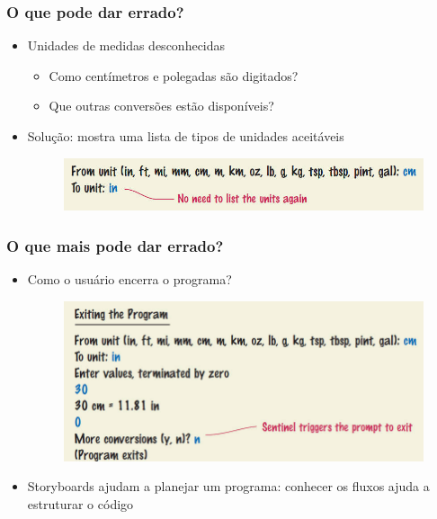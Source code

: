 \documentclass[xcolor={dvipsnames,table},aspectratio=169]{beamer}
\begin{document}
\begin{frame}\frametitle{O que pode dar errado?}
\begin{itemize}
	\item Unidades de medidas desconhecidas
	\begin{itemize}
		\item Como centímetros e polegadas são digitados?
		\item Que outras conversões estão disponíveis?
	\end{itemize}
	\item Solução: mostra uma lista de tipos de unidades aceitáveis
\begin{figure}[h]
	\includegraphics[height=0.15\paperheight,center]{pucrs-ep-fprog-unidade_04-lacos-laminas-storyboards2.jpg}
\end{figure}
\end{itemize}
\end{frame}

\begin{frame}\frametitle{O que mais pode dar errado?}
\begin{itemize}
	\item Como o usuário encerra o programa?
\begin{figure}[h]
	\includegraphics[height=0.5\paperheight,center]{pucrs-ep-fprog-unidade_04-lacos-laminas-storyboards3.jpg}
\end{figure}
	\item Storyboards ajudam a planejar um programa: conhecer os fluxos ajuda a estruturar o código
\end{itemize}
\end{frame}
\end{document}
